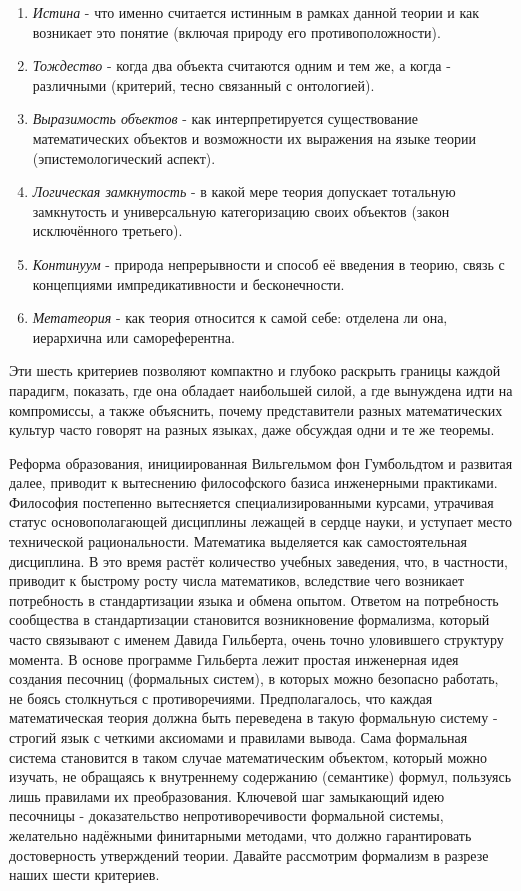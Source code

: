 \documentclass[12pt]{article}
\begin{document}
\begin{enumerate}
    \item {\it Истина} - что именно считается истинным в рамках данной теории и как возникает это понятие (включая природу его противоположности).
    \item {\it Тождество} - когда два объекта считаются одним и тем же, а когда - различными (критерий, тесно связанный с онтологией).
    \item {\it Выразимость объектов} - как интерпретируется существование математических объектов и возможности их выражения на языке теории (эпистемологический аспект).
    \item {\it Логическая замкнутость} - в какой мере теория допускает тотальную замкнутость и универсальную категоризацию своих объектов (закон исключённого третьего).
    \item {\it Континуум} - природа непрерывности и способ её введения в теорию, связь с концепциями импредикативности и бесконечности.
    \item {\it Метатеория} - как теория относится к самой себе: отделена ли она, иерархична или самореферентна.
\end{enumerate}

Эти шесть критериев позволяют компактно и глубоко раскрыть границы каждой парадигм, показать, где она обладает наибольшей силой, а где вынуждена идти на компромиссы, а также объяснить, почему представители разных математических культур часто говорят на разных языках, даже обсуждая одни и те же теоремы. 

Реформа образования, инициированная Вильгельмом фон Гумбольдтом и развитая далее, приводит к вытеснению философского базиса инженерными практиками. Философия постепенно вытесняется специализированными курсами, утрачивая статус основополагающей дисциплины лежащей в сердце науки, и уступает место технической рациональности. Математика выделяется как самостоятельная дисциплина. В это время растёт количество учебных заведения, что, в частности, приводит к быстрому росту числа математиков, вследствие чего возникает потребность в стандартизации языка и обмена опытом. Ответом на потребность сообщества в стандартизации становится возникновение формализма, который часто связывают с именем Давида Гильберта, очень точно уловившего структуру момента. В основе программе Гильберта лежит простая инженерная идея создания песочниц (формальных систем), в которых можно безопасно работать, не боясь столкнуться с противоречиями. Предполагалось, что каждая математическая теория должна быть переведена в такую формальную систему - строгий язык с четкими аксиомами и правилами вывода. Сама формальная система становится в таком случае математическим объектом, который можно изучать, не обращаясь к внутреннему содержанию (семантике) формул, пользуясь лишь правилами их преобразования. Ключевой шаг замыкающий идею песочницы - доказательство непротиворечивости формальной системы, желательно надёжными финитарными методами, что должно гарантировать достоверность утверждений теории. Давайте рассмотрим формализм в разрезе наших шести критериев.
\end{document}
